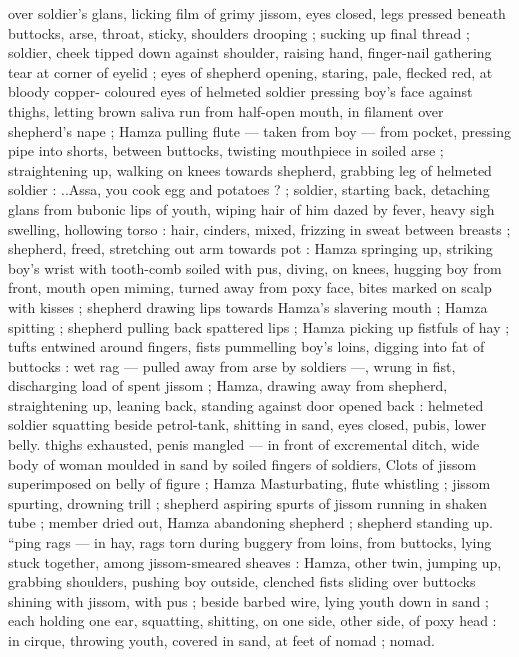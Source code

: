 over soldier's glans, licking film of grimy jissom, eyes closed, legs 
pressed beneath buttocks, arse, throat, sticky, shoulders drooping ; 
sucking up final thread ; soldier, cheek tipped down against shoulder, 
raising hand, finger-nail gathering tear at corner of eyelid ; eyes of 
shepherd opening, staring, pale, flecked red, at bloody copper- 
coloured eyes of helmeted soldier pressing boy's face against 
thighs, letting brown saliva run from half-open mouth, in filament 
over shepherd's nape ; Hamza pulling flute --- taken from boy --- 
from pocket, pressing pipe into shorts, between buttocks, twisting 
mouthpiece in soiled arse ; straightening up, walking on knees 
towards shepherd, grabbing leg of helmeted soldier : {\gl}..Assa, you 
cook egg and potatoes ? {\gr} ; soldier, starting back, detaching glans 
from bubonic lips of youth, wiping hair of him dazed by fever, heavy 
sigh swelling, hollowing torso : hair, cinders, mixed, frizzing in sweat 
between breasts ; shepherd, freed, stretching out arm towards pot : 
Hamza springing up, striking boy's wrist with tooth-comb soiled with 
pus, diving, on knees, hugging boy from front, mouth open miming, 
turned away from poxy face, bites marked on scalp with kisses ; 
shepherd drawing lips towards Hamza's slavering mouth ; Hamza 
spitting ; shepherd pulling back spattered lips ; Hamza picking up 
fistfuls of hay ; tufts entwined around fingers, fists pummelling boy's 
loins, digging into fat of buttocks : wet rag --- pulled away from arse 
by soldiers ---, wrung in fist, discharging load of spent jissom ; 
Hamza, drawing away from shepherd, straightening up, leaning back, 
standing against door opened back : helmeted soldier squatting 
beside petrol-tank, shitting in sand, eyes closed, pubis, lower belly. 
thighs exhausted, penis mangled --- in front of excremental ditch, 
wide body of woman moulded in sand by soiled fingers of soldiers, 
Clots of jissom superimposed on belly of figure ; Hamza 
Masturbating, flute whistling ; jissom spurting, drowning trill ; 
shepherd aspiring spurts of jissom running in shaken tube ; member 
dried out, Hamza abandoning shepherd ; shepherd standing up. 
“ping rags --- in hay, rags torn during buggery from loins, from 
buttocks, lying stuck together, among jissom-smeared sheaves : 
Hamza, other twin, jumping up, grabbing shoulders, pushing boy 
outside, clenched fists sliding over buttocks shining with jissom, with 
pus ; beside barbed wire, lying youth down in sand ; each holding 
one ear, squatting, shitting, on one side, other side, of poxy head : 
in cirque, throwing youth, covered in sand, at feet of nomad ; nomad. 
